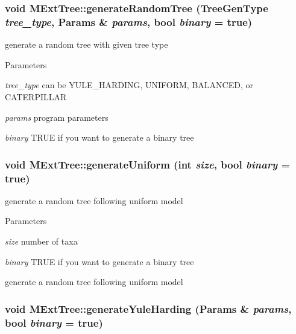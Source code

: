 \hypertarget{classMExtTree_aa709714f825099a4128ff8eb0fc3c419}{
\subsubsection[{generateRandomTree}]{\setlength{\rightskip}{0pt plus 5cm}void MExtTree::generateRandomTree (TreeGenType {\em tree\_\-type}, \/  {\bf Params} \& {\em params}, \/  bool {\em binary} = {\ttfamily true})}}
\label{classMExtTree_aa709714f825099a4128ff8eb0fc3c419}
generate a random tree with given tree type 
\begin{DoxyParams}{Parameters}
\item[{\em tree\_\-type}]can be YULE\_\-HARDING, UNIFORM, BALANCED, or CATERPILLAR \item[{\em params}]program parameters \item[{\em binary}]TRUE if you want to generate a binary tree \end{DoxyParams}
\hypertarget{classMExtTree_a9fa7114ba07c9ae332235e5e2a5baf2b}{
\subsubsection[{generateUniform}]{\setlength{\rightskip}{0pt plus 5cm}void MExtTree::generateUniform (int {\em size}, \/  bool {\em binary} = {\ttfamily true})}}
\label{classMExtTree_a9fa7114ba07c9ae332235e5e2a5baf2b}
generate a random tree following uniform model 
\begin{DoxyParams}{Parameters}
\item[{\em size}]number of taxa \item[{\em binary}]TRUE if you want to generate a binary tree\end{DoxyParams}
generate a random tree following uniform model \hypertarget{classMExtTree_a9e048ce7a85817ff65dabe6a739ab1d0}{
\subsubsection[{generateYuleHarding}]{\setlength{\rightskip}{0pt plus 5cm}void MExtTree::generateYuleHarding ({\bf Params} \& {\em params}, \/  bool {\em binary} = {\ttfamily true})}}
